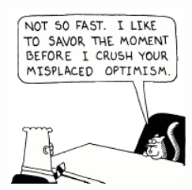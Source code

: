 \documentclass{beamer}
\begin{document}
\begin{frame}
\begin{center}
 \includegraphics[width=6cm]{files/catbert.png}\\
\end{center}
\end{frame}


\begin{frame}
  \begin{center}
    \begin{Huge}
    \end{Huge}
  \end{center}
\end{frame}

\end{document}
